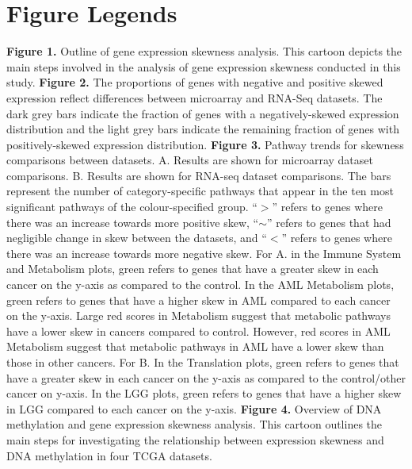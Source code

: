 \documentclass[11pt]{article}
\begin{document}
\section*{Figure Legends}

\textbf{Figure 1.} Outline of gene expression skewness analysis. This cartoon depicts the main steps involved in the analysis of gene expression skewness conducted in this study. 
\newline
\newline
\textbf{Figure 2.} The proportions of genes with negative and positive skewed expression reflect differences between microarray and RNA-Seq datasets. The dark grey bars indicate the fraction of genes 
with a negatively-skewed expression distribution and the light grey bars indicate the remaining fraction of genes with positively-skewed expression distribution.
\newline
\newline
\textbf{Figure 3.} Pathway trends for skewness comparisons between datasets. A. Results are shown for microarray dataset comparisons. B. Results are shown for RNA-seq dataset comparisons. The bars represent the number of category-specific pathways that appear in the ten most significant pathways of the colour-specified group. “$>$” refers to genes where there was an increase towards more positive skew, “$\sim$” refers to genes that had negligible change in skew between the datasets, and “$<$” refers to genes where there was an increase towards more negative skew. For A. in the Immune System and Metabolism plots, green refers to genes that have a greater skew in each cancer on the y-axis as compared to the control. In the AML Metabolism plots, green refers to genes that have a higher skew in AML compared to each cancer on the y-axis. Large red scores in Metabolism suggest that metabolic pathways have a lower skew in cancers compared to control. However, red scores in AML Metabolism suggest that metabolic pathways in AML have a lower skew than those in other cancers. For B. In the Translation plots, green refers to genes that have a greater skew in each cancer on the y-axis as compared to the control/other cancer on y-axis. In the LGG plots, green refers to genes that have a higher skew in LGG compared to each cancer on the y-axis.
\newline
\newline
\textbf{Figure 4.} Overview of DNA methylation and gene expression skewness analysis. This cartoon outlines the main steps for investigating the relationship between expression skewness and DNA methylation in four TCGA datasets. 
\end{document}
